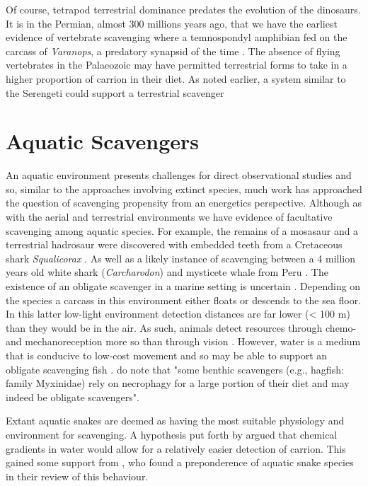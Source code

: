 \documentclass[a4paper,12pt]{article}
\begin{document}
Of course, tetrapod terrestrial dominance predates the evolution of the dinosaurs. It is in the Permian, almost 300 millions years ago, that we have the earliest evidence of vertebrate scavenging where a temnospondyl amphibian fed on the carcass of \textit{Varanops}, a predatory synapsid of the time \citep{reisz2006articulated}. The absence of flying vertebrates in the Palaeozoic may have permitted terrestrial forms to take in a higher proportion of carrion in their diet. As noted earlier, a system similar to the Serengeti could support a terrestrial scavenger \citep{ruxton2004obligate} 

\section*{Aquatic Scavengers} 
An aquatic environment presents challenges for direct observational studies and so, similar to the approaches involving extinct species, much work has approached the question of scavenging propensity from an energetics perspective. Although as with the aerial and terrestrial environments we have evidence of facultative scavenging among aquatic species. For example, the remains of a mosasaur and a terrestrial hadrosaur were discovered with embedded teeth from a Cretaceous shark \textit{Squalicorax} \citep{schwimmer1997scavenging}. As well as a likely instance of scavenging between a 4 million years old white shark (\textit{Carcharodon}) and mysticete whale from Peru \citep{ehret2009caught}.
The existence of an obligate scavenger in a marine setting is uncertain \citep{britton1994marine,smith2003ecology,ruxton2004energetic,ruxton2005searching}. Depending on the species a carcass in this environment either floats or descends to the sea floor. In this latter low-light environment detection distances are far lower (< 100 m) than they would be in the air. As such, animals detect resources through chemo- and mechanoreception more so than through vision \citep{ruxton2004energetic}. However, water is a medium that is conducive to low-cost movement \citep{tucker1975energetic} and so may be able to support an obligate scavenging fish \citep{ruxton2004energetic,ruxton2005searching}. \cite{benbow2015introduction} do note that "some benthic scavengers (e.g., hagfish: family Myxinidae) rely on necrophagy for a large portion of their diet and may indeed be obligate scavengers". 

Extant aquatic snakes are deemed as having the most suitable physiology and environment for scavenging. A hypothesis put forth by \cite{sazima1990necrofagia} argued that chemical gradients in water would allow for a relatively easier detection of carrion. This gained some support from \cite{devault2002scavenging}, who found a preponderence of aquatic snake species in their review of this behaviour. 
\end{document}
